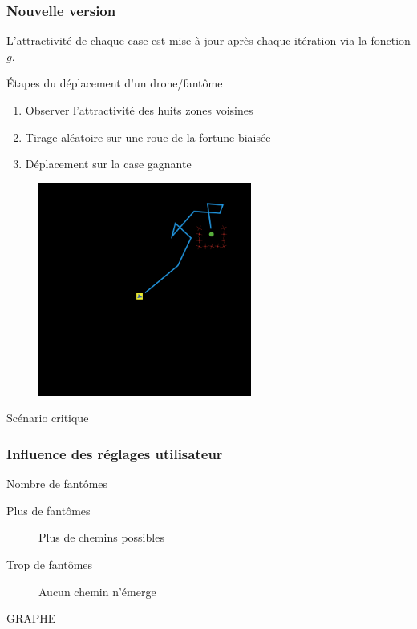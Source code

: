 \documentclass{beamer}
\begin{document}
\begin{frame}

  \frametitle{Nouvelle version}

  L'attractivité de chaque case est mise à jour après chaque itération
  via la fonction $g$.

  \vfill

  \begin{block}{\'Etapes du déplacement d'un drone/fantôme}
    \begin{enumerate}
    \item{Observer l'attractivité des huits zones voisines}
    \item{Tirage aléatoire sur une roue de la fortune biaisée}
    \item{Déplacement sur la case gagnante}
    \end{enumerate}
  \end{block}

\end{frame}

\begin{frame}

  \begin{figure}
    \centering
    \includegraphics[width=7cm]{path2.png}
  \end{figure}

  \vfill

  \begin{center}
    Scénario critique
  \end{center}

\end{frame}

\begin{frame}

  \frametitle{Influence des réglages utilisateur}

  \begin{block}{Nombre de fantômes}
    \begin{description}
      \item[Plus de fantômes]{Plus de chemins possibles}
      \item[Trop de fantômes]{Aucun chemin n'émerge}
    \end{description}
  \end{block}

  \vfill

  GRAPHE

\end{frame}
\end{document}
